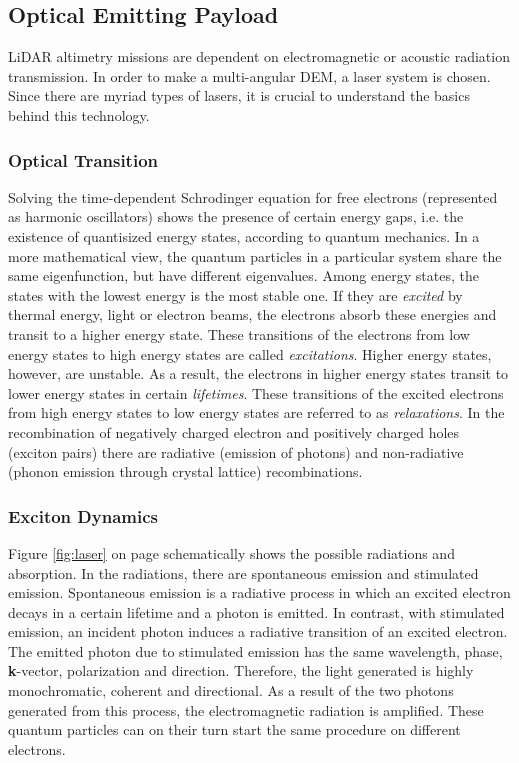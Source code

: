 \subsection{Optical Emitting Payload}
	\label{mtDOLSR}
\acs{LiDAR} altimetry missions are dependent on electromagnetic or acoustic radiation transmission. In order to make a multi-angular \acs{DEM}, a \ac{laser} system is chosen. Since there are myriad types of \acs{laser}s, it is crucial to understand the basics behind this technology.  

	\subsubsection{Optical Transition}
\cite{laser_fundamental}Solving the time-dependent Schrodinger equation for free electrons (represented as harmonic oscillators) shows the presence of certain energy gaps, i.e. the existence of quantisized energy states, according to quantum mechanics. In a more mathematical view, the quantum particles in a particular system share the same eigenfunction, but have different eigenvalues. Among energy states, the states with the lowest energy is the most stable one. If they are \textit{excited} by thermal energy, light or electron beams, the electrons absorb these energies and transit to a higher energy state. These transitions of the electrons from low energy states to high energy states are called \textit{excitations}. Higher energy states, however, are unstable. As a result, the electrons in higher energy states transit to lower energy states in certain \textit{lifetimes}. These transitions of the excited electrons from high energy states to low energy states are referred to as \textit{relaxations}. In the recombination of negatively charged electron and positively charged holes (exciton pairs) there are radiative (emission of photons) and non-radiative (phonon emission through crystal lattice) recombinations.

	\subsubsection{Exciton Dynamics}   
Figure \ref{fig:laser} on page \pageref{fig:laser} schematically shows the possible radiations and absorption. In the radiations, there are spontaneous emission and stimulated emission. Spontaneous emission is a radiative process in which an excited electron decays in a certain lifetime and a photon is emitted. In contrast, with stimulated emission, an incident photon induces a radiative transition of an excited electron. The emitted photon due to stimulated emission has the same wavelength, phase, \textbf{k}-vector, polarization and direction. Therefore, the light generated is highly monochromatic, coherent and directional. As a result of the two photons generated from this process, the electromagnetic radiation is amplified. These quantum particles can on their turn start the same procedure on different electrons. 

